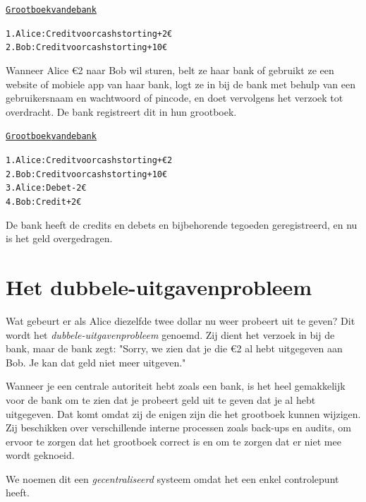 \documentclass[smalldemyvopaper,11pt,twoside,onecolumn,openright,extrafontsizes]{memoir}
\begin{document}
\begin{alltt}
\underline{Grootboek van de bank}

    1. Alice: Credit voor cash storting +2€
    2. Bob: Credit voor cash storting +10€
\end{alltt}

Wanneer Alice €2 naar Bob wil sturen, belt ze haar bank of gebruikt ze een website of mobiele app van haar bank, logt ze in bij de bank met behulp van een gebruikersnaam en wachtwoord of pincode, en doet vervolgens het verzoek tot overdracht. De bank registreert dit in hun grootboek.

\begin{alltt}
\underline{Grootboek van de bank}

    1. Alice: Credit voor cash storting +€2
    2. Bob: Credit voor cash storting +10€
    3. Alice: Debet -2€
    4. Bob: Credit +2€
\end{alltt}

De bank heeft de credits en debets en bijbehorende tegoeden geregistreerd, en nu is het geld overgedragen.

\section{Het dubbele-uitgavenprobleem}

Wat gebeurt er als Alice diezelfde twee dollar nu weer probeert uit te geven? Dit wordt het \textit{dubbele-uitgavenprobleem} genoemd. Zij dient het verzoek in bij de bank, maar de bank zegt: "Sorry, we zien dat je die €2 al hebt uitgegeven aan Bob. Je kan dat geld niet meer uitgeven."

Wanneer je een centrale autoriteit hebt zoals een bank, is het heel gemakkelijk voor de bank om te zien dat je probeert geld uit te geven dat je al hebt uitgegeven. Dat komt omdat zij de enigen zijn die het grootboek kunnen wijzigen. Zij beschikken over verschillende interne processen zoals back-ups en audits, om ervoor te zorgen dat het grootboek correct is en om te zorgen dat er niet mee wordt geknoeid.

We noemen dit een \textit{gecentraliseerd} systeem omdat het een enkel controlepunt heeft.
\end{document}
